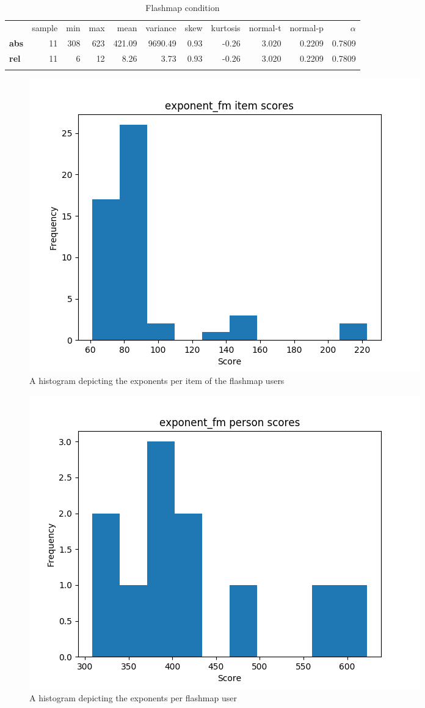 \begin{longtable}[c]{@{}lrrrrrrrrrr@{}}
    \caption{Flashmap condition}
    \endfirsthead
\toprule\addlinespace
& sample & min & max & mean & variance & skew & kurtosis & normal-t &
normal-p & $\alpha$
\\\addlinespace
\midrule
\textbf{abs} & 11 & 308 & 623 & 421.09 & 9690.49 & 0.93 & -0.26 & 3.020
& 0.2209 & 0.7809
\\\addlinespace
\textbf{rel} & 11 & 6 & 12 & 8.26 & 3.73 & 0.93 & -0.26 & 3.020 & 0.2209
& 0.7809
\\\addlinespace
\bottomrule
    \label{tab:exponent_fm}
\end{longtable}

\begin{figure}
    \centering
    \includegraphics[width=.7\textwidth]{img/exponent_fm_diff.png}
    \caption{A histogram depicting the exponents per item of the flashmap users}
    \label{fig:exponent_fm_diff}
\end{figure}
\begin{figure}
    \centering
    \includegraphics[width=.7\textwidth]{img/exponent_fm_abil.png}
    \caption{A histogram depicting the exponents per flashmap user}
    \label{fig:exponent_fm_abil}
\end{figure}

